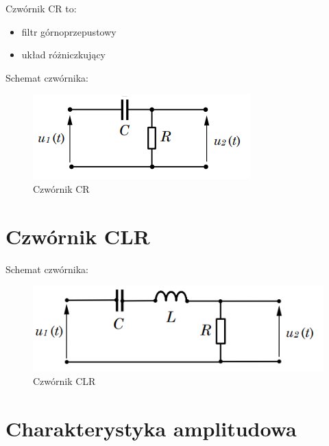 Czwórnik CR to: 
\begin{itemize}
    \item filtr górnoprzepustowy
    \item układ różniczkujący
\end{itemize}

Schemat czwórnika:

\begin{figure}[H]
    \centering
    \includegraphics[]{img_wyklad/CR.png}
    \caption{Czwórnik CR}
    \label{fig:CR}
\end{figure}

\section{Czwórnik CLR}

Schemat czwórnika:

\begin{figure}[H]
    \centering
    \includegraphics[scale=0.6]{img_wyklad/CLR.png}
    \caption{Czwórnik CLR}
    \label{fig:CLR}
\end{figure}

\section{Charakterystyka amplitudowa}
\label{poprawa:charakterystyka_amplitudowa}

